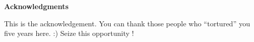 \centerline{{\bf \Large Acknowledgments}} \vspace{5mm} \noindent

This is the acknowledgement.
You can thank those people who ``tortured'' you five years here. :)
Seize this opportunity !